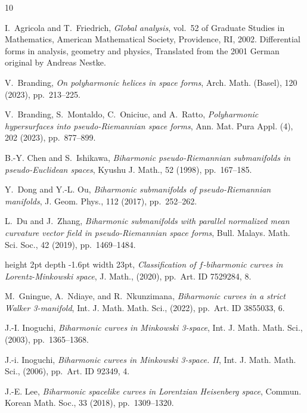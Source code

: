 \documentclass[11pt]{amsart}
\theoremstyle{plain}
\theoremstyle{definition}
\numberwithin{equation}{section}
\begin{document}
\begin{thebibliography}{10}

{\sc I.~Agricola and T.~Friedrich}, {\em Global analysis}, vol.~52 of Graduate
  Studies in Mathematics, American Mathematical Society, Providence, RI, 2002.
\newblock Differential forms in analysis, geometry and physics, Translated from
  the 2001 German original by Andreas Nestke.

{\sc V.~Branding}, {\em On polyharmonic helices in space forms}, Arch. Math.
  (Basel), 120 (2023), pp.~213--225.

{\sc V.~Branding, S.~Montaldo, C.~Oniciuc, and A.~Ratto}, {\em Polyharmonic
  hypersurfaces into pseudo-{R}iemannian space forms}, Ann. Mat. Pura Appl.
  (4), 202 (2023), pp.~877--899.

{\sc B.-Y. Chen and S.~Ishikawa}, {\em Biharmonic pseudo-{R}iemannian
  submanifolds in pseudo-{E}uclidean spaces}, Kyushu J. Math., 52 (1998),
  pp.~167--185.

{\sc Y.~Dong and Y.-L. Ou}, {\em Biharmonic submanifolds of pseudo-{R}iemannian
  manifolds}, J. Geom. Phys., 112 (2017), pp.~252--262.

{\sc L.~Du and J.~Zhang}, {\em Biharmonic submanifolds with parallel normalized
  mean curvature vector field in pseudo-{R}iemannian space forms}, Bull.
  Malays. Math. Sci. Soc., 42 (2019), pp.~1469--1484.

\leavevmode\vrule height 2pt depth -1.6pt width 23pt, {\em Classification of
  {$f$}-biharmonic curves in {L}orentz-{M}inkowski space}, J. Math.,  (2020),
  pp.~Art. ID 7529284, 8.

{\sc M.~Gningue, A.~Ndiaye, and R.~Nkunzimana}, {\em Biharmonic curves in a
  strict {W}alker 3-manifold}, Int. J. Math. Math. Sci.,  (2022), pp.~Art. ID
  3855033, 6.

{\sc J.-I. Inoguchi}, {\em Biharmonic curves in {M}inkowski 3-space}, Int. J.
  Math. Math. Sci.,  (2003), pp.~1365--1368.

{\sc J.-i. Inoguchi}, {\em Biharmonic curves in {M}inkowski 3-space. {II}},
  Int. J. Math. Math. Sci.,  (2006), pp.~Art. ID 92349, 4.

{\sc J.-E. Lee}, {\em Biharmonic spacelike curves in {L}orentzian {H}eisenberg
  space}, Commun. Korean Math. Soc., 33 (2018), pp.~1309--1320.


\end{thebibliography}
\end{document}
